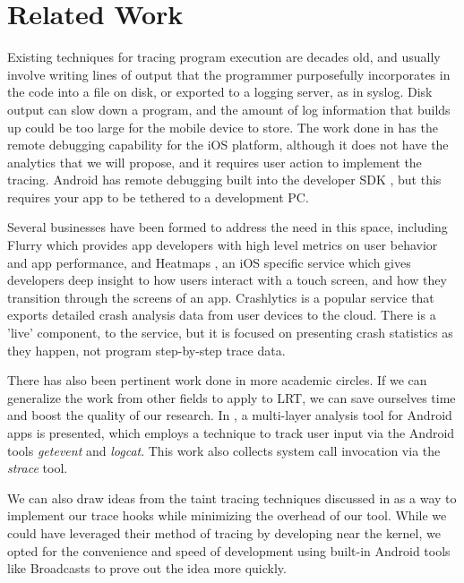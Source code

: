\section{Related Work}
\label{section:relatedwork}
Existing techniques for tracing program execution are decades old, and usually involve writing lines of output that the programmer purposefully incorporates 
in the code into a file on disk, or exported to a logging server, as in syslog. 
Disk output can slow down a program, and the amount of log information that 
builds up could be too large for the mobile device to store. The work done in 
\cite{NSLogger} has the remote debugging capability for the iOS platform, although 
it does not have the analytics that we will propose, and it requires user action 
to implement the tracing. Android has remote debugging built into the developer 
SDK \cite{AndroidRemoteDebugTool}, but this requires your app to be tethered to a development PC.

Several businesses have been formed to address the need in this space, including
Flurry \cite{Flurry} which provides app developers with high level metrics on
user behavior and app performance, and Heatmaps \cite{Heatmaps}, an iOS specific
service which gives developers deep insight to how users interact with a touch
screen, and how they transition through the screens of an app. 
Crashlytics \cite{Crashlytics} is a popular service that exports detailed
crash analysis data from user devices to the cloud. There is a 'live' component,
to the service, but it is focused on presenting crash statistics as they happen,
not program step-by-step trace data.

There has also been pertinent work done in more academic circles. If we can 
generalize the work from other fields to apply to LRT, we can save ourselves 
time and boost the quality of our research. In \cite{ProfileDroid}, a 
multi-layer analysis tool for Android apps is presented, which employs a 
technique to track user input via the Android tools \emph{getevent} and \emph{logcat}. 
This work also collects system call invocation via the \emph{strace} tool. 

We can also draw ideas from the taint tracing techniques discussed in 
\cite{TaintDroid} as a way to implement our trace hooks while minimizing 
the overhead of our tool. While we could have leveraged their method of 
tracing by developing near the kernel, we opted for the convenience and 
speed of development using built-in Android tools like Broadcasts to prove
out the idea more quickly. 

